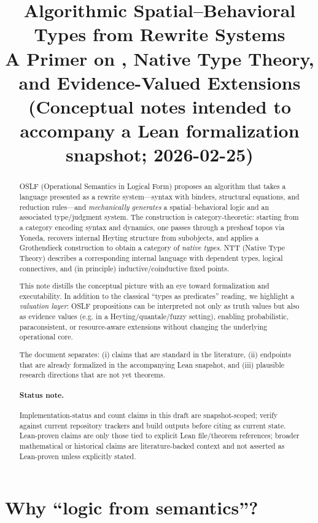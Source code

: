 \documentclass[11pt]{article}
\title{Algorithmic Spatial--Behavioral Types from Rewrite Systems\\
\large A Primer on \OSLF{}, Native Type Theory, and Evidence-Valued Extensions\\
\small (Conceptual notes intended to accompany a Lean formalization snapshot; 2026-02-25)}
\author{}
\date{}
\newcommand{\OSLF}{\textsf{OSLF}}
\newcommand{\NTT}{\textsf{NTT}}
\begin{document}
\maketitle

\begin{abstract}
\OSLF{} (Operational Semantics in Logical Form) proposes an algorithm that takes a language
presented as a rewrite system---syntax with binders, structural equations, and reduction rules---and
\emph{mechanically generates} a spatial--behavioral logic and an associated type/judgment system.
The construction is category-theoretic: starting from a category encoding syntax and dynamics,
one passes through a presheaf topos via Yoneda, recovers internal Heyting structure from subobjects,
and applies a Grothendieck construction to obtain a category of \emph{native types}.
\NTT{} (Native Type Theory) describes a corresponding internal language with dependent types,
logical connectives, and (in principle) inductive/coinductive fixed points.

This note distills the conceptual picture with an eye toward formalization and executability.
In addition to the classical ``types as predicates'' reading, we highlight a \emph{valuation layer}:
OSLF propositions can be interpreted not only as truth values but also as evidence values
(e.g. in a Heyting/quantale/fuzzy setting), enabling probabilistic, paraconsistent, or resource-aware
extensions without changing the underlying operational core.

The document separates: (i) claims that are standard in the literature, (ii) endpoints that are already
formalized in the accompanying Lean snapshot, and (iii) plausible research directions that are not yet
theorems.
\paragraph{Status note.} Implementation-status and count claims in this draft are snapshot-scoped; verify against current repository trackers and build outputs before citing as current state. Lean-proven claims are only those tied to explicit Lean file/theorem references; broader mathematical or historical claims are literature-backed context and not asserted as Lean-proven unless explicitly stated.
\end{abstract}

\tableofcontents

\section{Why ``logic from semantics''?}
\end{document}
